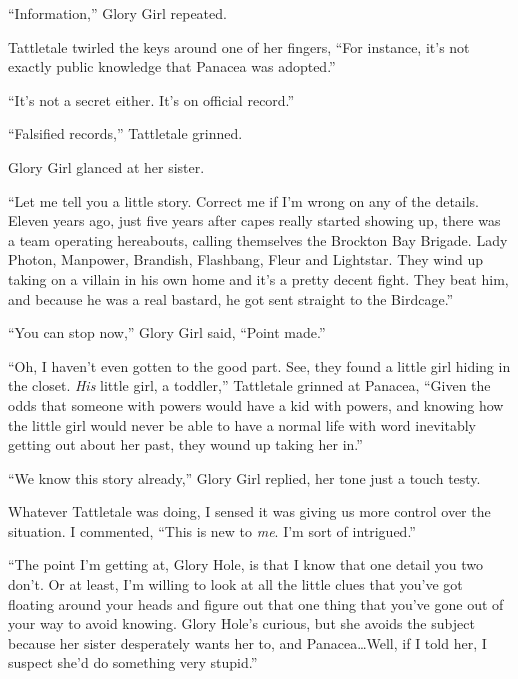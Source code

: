 





``Information,'' Glory Girl repeated.



Tattletale twirled the keys around one of her fingers, ``For instance, it's not exactly public knowledge that Panacea was adopted.''



``It's not a secret either.  It's on official record.''



``Falsified records,'' Tattletale grinned.



Glory Girl glanced at her sister.



``Let me tell you a little story.  Correct me if I'm wrong on any of the details.  Eleven years ago, just five years after capes really started showing up, there was a team operating hereabouts, calling themselves the Brockton Bay Brigade.  Lady Photon, Manpower, Brandish, Flashbang, Fleur and Lightstar.  They wind up taking on a villain in his own home and it's a pretty decent fight.  They beat him, and because he was a real bastard, he got sent straight to the Birdcage.''



``You can stop now,'' Glory Girl said, ``Point made.''



``Oh, I haven't even gotten to the good part.  See, they found a little girl hiding in the closet.  \emph{His} little girl, a toddler,'' Tattletale grinned at Panacea, ``Given the odds that someone with powers would have a kid with powers, and knowing how the little girl would never be able to have a normal life with word inevitably getting out about her past, they wound up taking her in.''



``We know this story already,'' Glory Girl replied, her tone just a touch testy.



Whatever Tattletale was doing, I sensed it was giving us more control over the situation.  I commented, ``This is new to \emph{me}.  I'm sort of intrigued.''



``The point I'm getting at, Glory Hole, is that I know that one detail you two don't.  Or at least, I'm willing to look at all the little clues that you've got floating around your heads and figure out that one thing that you've gone out of your way to avoid knowing.  Glory Hole's curious, but she avoids the subject because her sister desperately wants her to, and Panacea\ldots  Well, if I told her, I suspect she'd do something very stupid.''



